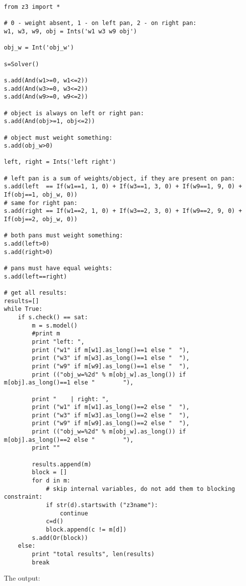 \begin{lstlisting}
from z3 import *

# 0 - weight absent, 1 - on left pan, 2 - on right pan:
w1, w3, w9, obj = Ints('w1 w3 w9 obj')

obj_w = Int('obj_w')

s=Solver()

s.add(And(w1>=0, w1<=2))
s.add(And(w3>=0, w3<=2))
s.add(And(w9>=0, w9<=2))

# object is always on left or right pan:
s.add(And(obj>=1, obj<=2))

# object must weight something:
s.add(obj_w>0)

left, right = Ints('left right')

# left pan is a sum of weights/object, if they are present on pan:
s.add(left  == If(w1==1, 1, 0) + If(w3==1, 3, 0) + If(w9==1, 9, 0) + If(obj==1, obj_w, 0))
# same for right pan:
s.add(right == If(w1==2, 1, 0) + If(w3==2, 3, 0) + If(w9==2, 9, 0) + If(obj==2, obj_w, 0))

# both pans must weight something:
s.add(left>0)
s.add(right>0)

# pans must have equal weights:
s.add(left==right)

# get all results:
results=[]
while True:
    if s.check() == sat:
        m = s.model()
        #print m
        print "left: ",
        print ("w1" if m[w1].as_long()==1 else "  "),
        print ("w3" if m[w3].as_long()==1 else "  "),
        print ("w9" if m[w9].as_long()==1 else "  "),
        print (("obj_w=%2d" % m[obj_w].as_long()) if m[obj].as_long()==1 else "        "),

        print "    | right: ",
        print ("w1" if m[w1].as_long()==2 else "  "),
        print ("w3" if m[w3].as_long()==2 else "  "),
        print ("w9" if m[w9].as_long()==2 else "  "),
        print (("obj_w=%2d" % m[obj_w].as_long()) if m[obj].as_long()==2 else "        "),
        print ""

        results.append(m)
        block = []
        for d in m:
            # skip internal variables, do not add them to blocking constraint:
            if str(d).startswith ("z3name"):
                continue
            c=d()
            block.append(c != m[d])
        s.add(Or(block))
    else:
        print "total results", len(results)
        break
\end{lstlisting}

The output:


